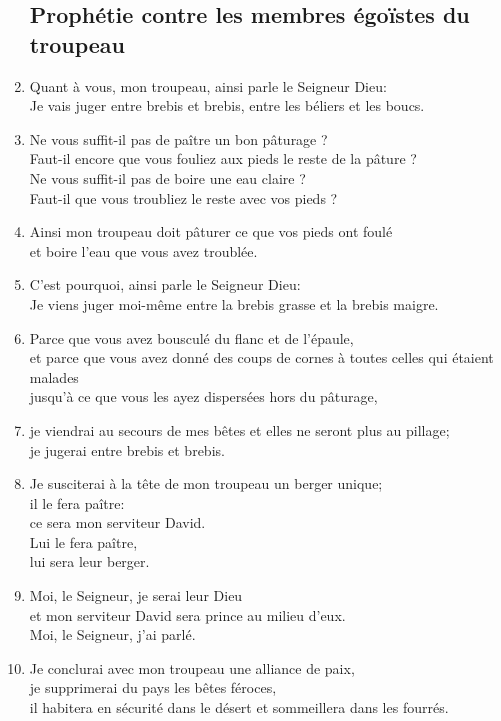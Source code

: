 \begin{enumerate}[leftmargin=\psleftmargin, labelsep = \pslabelsep, label={\arabic*}, font=\color{\pscolor}\small\textsuperscript, parsep=0em, itemsep=0em, topsep=0em ]
          \subsection*{Prophétie contre les membres égoïstes du troupeau}
    \item Quant à vous, mon troupeau, ainsi parle le Seigneur Dieu: \\ Je vais juger entre brebis et brebis, entre les béliers et les boucs.
    \item Ne vous suffit-il pas de paître un bon pâturage ? \\ Faut-il encore que vous fouliez aux pieds le reste de la pâture ? \\ Ne vous suffit-il pas de boire une eau claire ? \\ Faut-il que vous troubliez le reste avec vos pieds ?
    \item Ainsi mon troupeau doit pâturer ce que vos pieds ont foulé \\ et boire l’eau que vous avez troublée. \verseSpace
    \item C’est pourquoi, ainsi parle le Seigneur Dieu: \\ Je viens juger moi-même entre la brebis grasse et la brebis maigre.
    \item Parce que vous avez bousculé du flanc et de l’épaule, \\ et parce que vous avez donné des coups de cornes à toutes celles qui étaient malades \\ jusqu’à ce que vous les ayez dispersées hors du pâturage,
    \item je viendrai au secours de mes bêtes et elles ne seront plus au pillage; \\ je jugerai entre brebis et brebis.
    \item Je susciterai à la tête de mon troupeau un berger unique; \\ il le fera paître: \\ ce sera mon serviteur David. \\ Lui le fera paître, \\ lui sera leur berger.
    \item Moi, le Seigneur, je serai leur Dieu \\ et mon serviteur David sera prince au milieu d’eux. \\ Moi, le Seigneur, j’ai parlé.
    \item Je conclurai avec mon troupeau une alliance de paix, \\ je supprimerai du pays les bêtes féroces, \\ il habitera en sécurité dans le désert et sommeillera dans les fourrés.

\end{enumerate}
